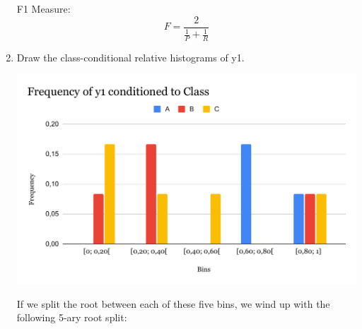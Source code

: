 \documentclass{article}
\begin{document}
\begin{enumerate}[leftmargin=\labelsep]
F1 Measure:
\begin{equation*}
  F = \frac{2}{\frac{1}{P}+\frac{1}{R}}
\end{equation*}

\vspace{10pt}



\item Draw the class-conditional relative histograms of y1.

\includegraphics[scale = 0.45, center]{img/histogram1_4.pdf}

If we split the root between each of these five bins, we wind 
up with the following 5-ary root split:

\fbox{
\centering
\begin{minipage}{\textwidth}
  \centering
  \textbf{Solution:} \\
  \begin{table}[H]
    \centering
    \begin{tabular}{ccccc}
      $[0; 0.20[$ & $[0.20; 0.40[$ & $[0.40; 0.60[$ & $[0.60; 0.80[$ & $[0.80; 1]$ \\ \midrule
      C & B & C & A & A 
    \end{tabular}
  \end{table}
\end{minipage}
}


\end{enumerate}
\end{document}
